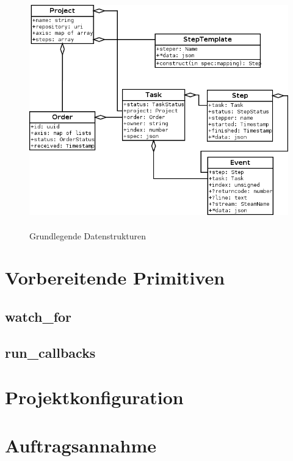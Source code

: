 \begin{figure}[ht] 
  \label{fig:datenstrukturen}
  \begin{center}
      \includegraphics[height=4in]{imageinput/datenstrukturen-step-templates.png}
  \end{center}
  \caption{Grundlegende Datenstrukturen}
\end{figure}




\section{Vorbereitende Primitiven}
\subsection{watch\_for}
\subsection{run\_callbacks}

\section{Projektkonfiguration}

\section{Auftragsannahme}

